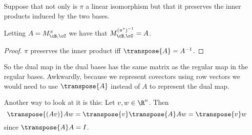 \documentclass[oneside,12pt]{amsart}
\begin{document}
\begin{corollary}
Suppose that not only is $\pi$ a linear isomorphism but that it preserves
the inner products induced by the two bases.

Letting $A = M^{\pi}_{\cB,\cC}$ we have that
$M^{(\pi^*)^{-1}}_{\cB,\cC} = A$.
\end{corollary}
\begin{proof}
$\pi$ preserves the inner product iff $\transpose{A} = A^{-1}$.
\end{proof}

\begin{note}
So the dual map in the dual bases has the same matrix as the
regular map in the regular bases.
Awkwardly, because we represent covectors using row vectors we would
need to use $\transpose{A}$ instead of $A$ to represent the dual map.

Another way to look at it is this: Let $v,w\in\R^n$. Then
$$\transpose{(Av)}Aw = \transpose{v}\transpose{A}Aw = \transpose{v}w$$
since $\transpose{A}A = I$.
\end{note}





\end{document}
